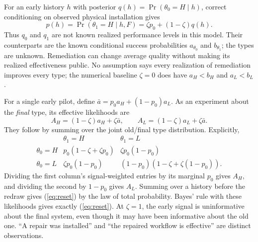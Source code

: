 \documentclass[11pt]{article}
\begin{document}
For an early history $h$ with posterior $q(h)=\Pr(\theta_0=H\mid h)$, correct conditioning on observed physical installation gives
\begin{equation}
 p(h)=\Pr(\theta_1=H\mid h,F)=\zeta p_0+(1-\zeta)q(h).\label{eq:reset}
\end{equation}
Thus $q_0$ and $q_1$ are not known realized performance levels in this model. Their counterparts are the known conditional success probabilities $a_{\theta_0}$ and $b_{\theta_1}$; the types are unknown. Remediation can change average quality without making its realized effectiveness public. No assumption says every realization of remediation improves every type; the numerical baseline $\zeta=0$ does have $a_H<b_H$ and $a_L<b_L$.

For a single early pilot, define $\bar a=p_0a_H+(1-p_0)a_L$. As an experiment about the \emph{final} type, its effective likelihoods are
\begin{equation}
 A_H=(1-\zeta)a_H+\zeta\bar a,\qquad
 A_L=(1-\zeta)a_L+\zeta\bar a.\label{eq:effective}
\end{equation}
They follow by summing over the joint old/final type distribution. Explicitly,
\[
\begin{array}{c|cc}
 &\theta_1=H&\theta_1=L\\\hline
\theta_0=H&p_0(1-\zeta+\zeta p_0)&\zeta p_0(1-p_0)\\
\theta_0=L&\zeta p_0(1-p_0)&(1-p_0)(1-\zeta+\zeta(1-p_0)).
\end{array}
\]
Dividing the first column's signal-weighted entries by its marginal $p_0$ gives $A_H$, and dividing the second by $1-p_0$ gives $A_L$. Summing over a history before the redraw gives (\ref{eq:reset}) by the law of total probability. Bayes' rule with these likelihoods gives exactly (\ref{eq:reset}). At $\zeta=1$, the early signal is uninformative about the final system, even though it may have been informative about the old one. ``A repair was installed'' and ``the repaired workflow is effective'' are distinct observations.
\end{document}
